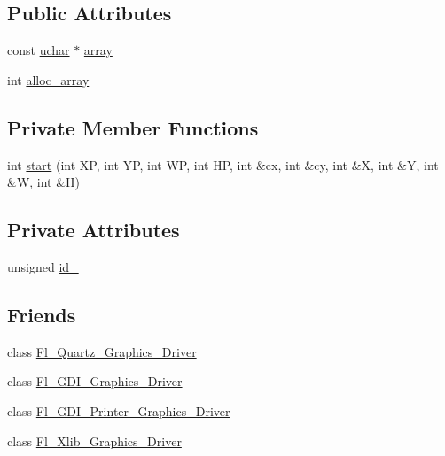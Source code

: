 \subsection*{Public Attributes}
\begin{DoxyCompactItemize}
\item 
const \hyperlink{fl__types_8h_a65f85814a8290f9797005d3b28e7e5fc}{uchar} $\ast$ \hyperlink{class_fl___bitmap_a2fe6a97b247740b5e0a2723818e69504}{array}
\item 
int \hyperlink{class_fl___bitmap_a5ff5bdc4e093728d84f2fcbce76a4aba}{alloc\+\_\+array}
\end{DoxyCompactItemize}
\subsection*{Private Member Functions}
\begin{DoxyCompactItemize}
\item 
int \hyperlink{class_fl___bitmap_abdf30ee205258d5ce5ca17823705c813}{start} (int XP, int YP, int WP, int HP, int \&cx, int \&cy, int \&X, int \&Y, int \&W, int \&H)
\end{DoxyCompactItemize}
\subsection*{Private Attributes}
\begin{DoxyCompactItemize}
\item 
unsigned \hyperlink{class_fl___bitmap_a30fc9af3a50a483b6d1cdd7389ae8d1d}{id\+\_\+}
\end{DoxyCompactItemize}
\subsection*{Friends}
\begin{DoxyCompactItemize}
\item 
class \hyperlink{class_fl___bitmap_a17e52a458f8b74600a08e84e14dd7788}{Fl\+\_\+\+Quartz\+\_\+\+Graphics\+\_\+\+Driver}
\item 
class \hyperlink{class_fl___bitmap_afdd004b46bf519fc92d7de53fa9e8f33}{Fl\+\_\+\+G\+D\+I\+\_\+\+Graphics\+\_\+\+Driver}
\item 
class \hyperlink{class_fl___bitmap_a0c87ae869fae93aeba9ddf11e9a1100c}{Fl\+\_\+\+G\+D\+I\+\_\+\+Printer\+\_\+\+Graphics\+\_\+\+Driver}
\item 
class \hyperlink{class_fl___bitmap_a0dc2ea59692c09f5b9d1f13cc66ad01d}{Fl\+\_\+\+Xlib\+\_\+\+Graphics\+\_\+\+Driver}
\end{DoxyCompactItemize}
